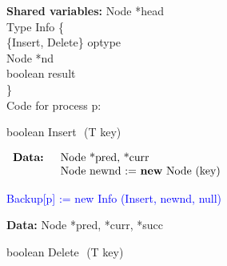 \begin{figure}[h]
	\vspace{-10mm}
	
	\footnotesize
	
	\textbf{Shared variables:} Node *head \\
	
	Type Info \{  \\
		\hspace*{6mm} \{Insert, Delete\} optype \\
		\hspace*{6mm} Node *nd \\
		\hspace*{6mm} boolean result \\
	\} \\
	
	Code for process p:
	
	\begin{procedure}[H]
		\caption{boolean Insert $ $ (T key)}
		
		$ \begin{array}{rl}
			\mbox{\textbf{Data: }}	&	\mbox{Node *pred, *curr} \\
									&	\mbox{Node newnd := \textbf{new} Node (key)}
		\end{array} $
		
		\textcolor{blue} {Backup[p] := new Info (Insert, newnd, null)} \;
		
	\end{procedure}
	
	
	\begin{procedure}[H]
		\caption{boolean Delete $ $ (T key)}
		
		\textbf{Data: } Node *pred, *curr, *succ
		

\end{procedure}
\end{figure}
